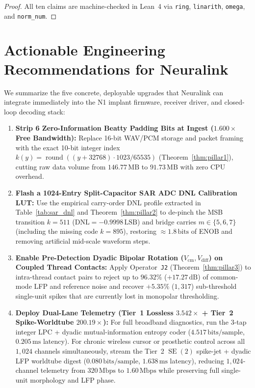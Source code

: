 \documentclass[11pt,letterpaper]{article}
\theoremstyle{definition}
\begin{document}
\begin{proof}
All ten claims are machine-checked in Lean~4 via \texttt{ring}, \texttt{linarith}, \texttt{omega}, and \texttt{norm\_num}.
\end{proof}

\section[Actionable Engineering Recommendations]{Actionable Engineering Recommendations for Neuralink}

We summarize the five concrete, deployable upgrades that Neuralink can integrate immediately into the N1 implant firmware, receiver driver, and closed-loop decoding stack:
\begin{enumerate}
  \item \textbf{Strip 6 Zero-Information Beatty Padding Bits at Ingest ($1.600\times$ Free Bandwidth):} Replace 16-bit WAV/PCM storage and packet framing with the exact 10-bit integer index $k(y) = \operatorname{round}((y+32768)\cdot 1023/65535)$ (Theorem~\ref{thm:pillar1}), cutting raw data volume from $146.77\,\text{MB}$ to $91.73\,\text{MB}$ with zero CPU overhead.
  \item \textbf{Flash a 1024-Entry Split-Capacitor SAR ADC DNL Calibration LUT:} Use the empirical carry-order DNL profile extracted in Table~\ref{tab:sar_dnl} and Theorem~\ref{thm:pillar2} to de-pinch the MSB transition $k = 511$ ($\mathrm{DNL} = -0.9998\,\text{LSB}$) and bridge carries $m \in \{5,6,7\}$ (including the missing code $k = 895$), restoring $\approx 1.8\,\text{bits}$ of ENOB and removing artificial mid-scale waveform steps.
  \item \textbf{Enable Pre-Detection Dyadic Bipolar Rotation ($V_{\mathrm{cm}}, V_{\mathrm{diff}}$) on Coupled Thread Contacts:} Apply Operator~\texttt{J2} (Theorem~\ref{thm:pillar3}) to intra-thread contact pairs to reject up to $96.32\%$ ($+17.27\,\text{dB}$) of common-mode LFP and reference noise and recover $+5.35\%$ ($1{,}317$) sub-threshold single-unit spikes that are currently lost in monopolar thresholding.
  \item \textbf{Deploy Dual-Lane Telemetry (Tier~1 Lossless $3.542\times$ + Tier~2 Spike-Worldtube $200.19\times$):} For full broadband diagnostics, run the 3-tap integer LPC + dyadic mutual-information entropy coder ($4.517\,\text{bits/sample}$, $0.205\,\text{ms}$ latency). For chronic wireless cursor or prosthetic control across all $1{,}024$ channels simultaneously, stream the Tier~2 $\operatorname{SE}(2)$ spike-jet + dyadic LFP worldtube digest ($0.080\,\text{bits/sample}$, $1.638\,\text{ms}$ latency), reducing $1{,}024$-channel telemetry from $320\,\text{Mbps}$ to \textbf{$1.60\,\text{Mbps}$} while preserving full single-unit morphology and LFP phase.

\end{enumerate}
\end{document}
